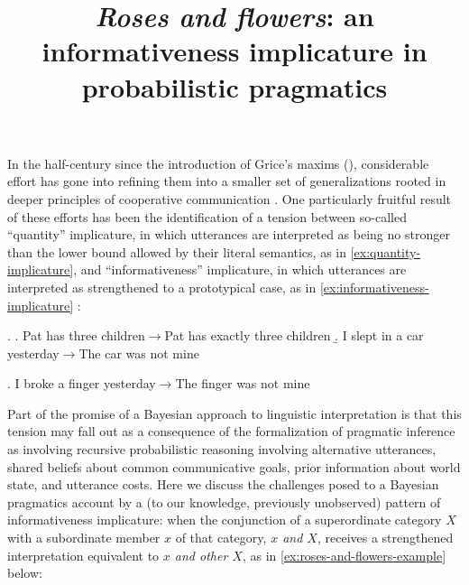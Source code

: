 \documentclass[11pt]{article}
\title{\vspace{-1.5cm}\large \bf \emph{Roses and flowers}: an informativeness implicature in
  probabilistic pragmatics\vspace{-2cm}}
\date{}
\begin{document}
\maketitle

\noindent
In the half-century since the introduction of Grice's maxims
(\citeyear{grice:1957,grice:1975}), considerable effort has gone
into refining them into a smaller set of generalizations rooted in
deeper principles of cooperative communication \citep[inter
alia]{horn:1984,sperber-wilson:1986,levinson:2000}. One particularly
fruitful result of these efforts has been the identification of a
tension between so-called ``quantity'' implicature, in which
utterances are interpreted as being no stronger than the lower bound
allowed by their literal semantics, as in \ref{ex:quantity-implicature}, and
``informativeness'' implicature, in which utterances are interpreted
as strengthened to a prototypical case, as in
\ref{ex:informativeness-implicature}
\citep{atlas-levinson:1981,horn:1984}:

\ex. \label{ex:quantity-implicature}
\a. Pat has three children$\rightarrow$Pat has exactly three children
\b. I slept in a car yesterday$\rightarrow$The car was not mine 

\ex. I broke a finger yesterday$\rightarrow$The finger was not mine \label{ex:informativeness-implicature}

Part of the promise of a Bayesian approach to linguistic
interpretation is that this tension may fall out as a consequence of
the formalization of pragmatic inference as involving recursive
probabilistic reasoning involving alternative utterances, shared
beliefs about common communicative goals, prior information about
world state, and utterance costs.  Here we discuss the challenges
posed to a Bayesian pragmatics account by a (to our knowledge,
previously unobserved) pattern of informativeness implicature: when
the conjunction of a superordinate category $X$ with a subordinate
member $x$ of that category, \emph{$x$ and $X$}, receives a
strengthened interpretation equivalent to \emph{$x$ and other $X$}, as
in \ref{ex:roses-and-flowers-example} below:
\end{document}
